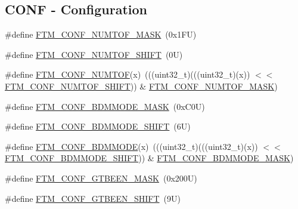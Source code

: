 \subsection*{C\+O\+NF -\/ Configuration}
\begin{DoxyCompactItemize}
\item 
\#define \mbox{\hyperlink{group___f_t_m___register___masks_gae8e95c8cac97f0cf6cec2edd277aaca3}{F\+T\+M\+\_\+\+C\+O\+N\+F\+\_\+\+N\+U\+M\+T\+O\+F\+\_\+\+M\+A\+SK}}~(0x1\+F\+U)
\item 
\#define \mbox{\hyperlink{group___f_t_m___register___masks_ga6ee8ba517c1d833d785fbe2fb0344726}{F\+T\+M\+\_\+\+C\+O\+N\+F\+\_\+\+N\+U\+M\+T\+O\+F\+\_\+\+S\+H\+I\+FT}}~(0\+U)
\item 
\#define \mbox{\hyperlink{group___f_t_m___register___masks_gaa084b68452f9be9a4f5231e046ff416e}{F\+T\+M\+\_\+\+C\+O\+N\+F\+\_\+\+N\+U\+M\+T\+OF}}(x)~(((uint32\+\_\+t)(((uint32\+\_\+t)(x)) $<$$<$ \mbox{\hyperlink{group___f_t_m___register___masks_ga6ee8ba517c1d833d785fbe2fb0344726}{F\+T\+M\+\_\+\+C\+O\+N\+F\+\_\+\+N\+U\+M\+T\+O\+F\+\_\+\+S\+H\+I\+FT}})) \& \mbox{\hyperlink{group___f_t_m___register___masks_gae8e95c8cac97f0cf6cec2edd277aaca3}{F\+T\+M\+\_\+\+C\+O\+N\+F\+\_\+\+N\+U\+M\+T\+O\+F\+\_\+\+M\+A\+SK}})
\item 
\#define \mbox{\hyperlink{group___f_t_m___register___masks_ga832712efda712d40d626989b691a0647}{F\+T\+M\+\_\+\+C\+O\+N\+F\+\_\+\+B\+D\+M\+M\+O\+D\+E\+\_\+\+M\+A\+SK}}~(0x\+C0\+U)
\item 
\#define \mbox{\hyperlink{group___f_t_m___register___masks_gacb37f407e308d688a6bcb6a50d67730f}{F\+T\+M\+\_\+\+C\+O\+N\+F\+\_\+\+B\+D\+M\+M\+O\+D\+E\+\_\+\+S\+H\+I\+FT}}~(6\+U)
\item 
\#define \mbox{\hyperlink{group___f_t_m___register___masks_gac35551a6fb1df02d6a0d83b0ec4df82a}{F\+T\+M\+\_\+\+C\+O\+N\+F\+\_\+\+B\+D\+M\+M\+O\+DE}}(x)~(((uint32\+\_\+t)(((uint32\+\_\+t)(x)) $<$$<$ \mbox{\hyperlink{group___f_t_m___register___masks_gacb37f407e308d688a6bcb6a50d67730f}{F\+T\+M\+\_\+\+C\+O\+N\+F\+\_\+\+B\+D\+M\+M\+O\+D\+E\+\_\+\+S\+H\+I\+FT}})) \& \mbox{\hyperlink{group___f_t_m___register___masks_ga832712efda712d40d626989b691a0647}{F\+T\+M\+\_\+\+C\+O\+N\+F\+\_\+\+B\+D\+M\+M\+O\+D\+E\+\_\+\+M\+A\+SK}})
\item 
\#define \mbox{\hyperlink{group___f_t_m___register___masks_ga2ab518e33ed4bcb533a022f469c62994}{F\+T\+M\+\_\+\+C\+O\+N\+F\+\_\+\+G\+T\+B\+E\+E\+N\+\_\+\+M\+A\+SK}}~(0x200\+U)
\item 
\#define \mbox{\hyperlink{group___f_t_m___register___masks_ga08e28bc089eeea68a240bb8e716172d8}{F\+T\+M\+\_\+\+C\+O\+N\+F\+\_\+\+G\+T\+B\+E\+E\+N\+\_\+\+S\+H\+I\+FT}}~(9\+U)

\end{DoxyCompactItemize}
